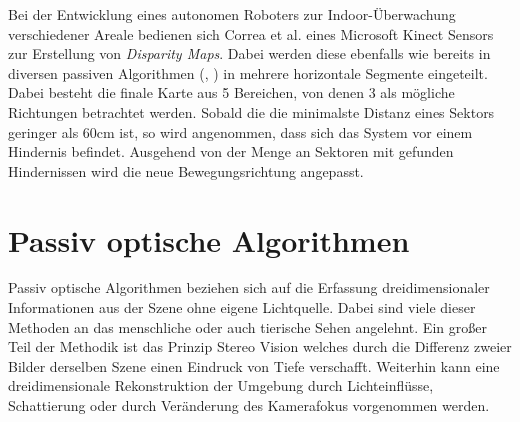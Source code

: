 \noindent
Bei der Entwicklung eines autonomen Roboters zur Indoor-Überwachung verschiedener Areale bedienen sich Correa et al. \cite{correa2012mobile} eines Microsoft Kinect Sensors zur Erstellung von \emph{Disparity Maps}. Dabei werden diese ebenfalls wie bereits in diversen passiven Algorithmen (\cite{pire2012stereo}, \cite{kostavelis2010comparative}) in mehrere horizontale Segmente eingeteilt. Dabei besteht die finale Karte aus 5 Bereichen, von denen 3 als mögliche Richtungen betrachtet werden. Sobald die die minimalste Distanz eines Sektors geringer als 60cm ist, so wird angenommen, dass sich das System vor einem Hindernis befindet. Ausgehend von der Menge an Sektoren mit gefunden Hindernissen wird die neue Bewegungsrichtung angepasst.

\section{Passiv optische Algorithmen}
\label{sec:sensor_basierte_he}
Passiv optische Algorithmen beziehen sich auf die Erfassung dreidimensionaler Informationen aus der Szene ohne eigene Lichtquelle. Dabei sind viele dieser Methoden an das menschliche oder auch tierische Sehen angelehnt. Ein großer Teil der Methodik ist das Prinzip Stereo Vision welches durch die Differenz zweier Bilder derselben Szene einen Eindruck von Tiefe verschafft. Weiterhin kann eine dreidimensionale Rekonstruktion der Umgebung durch Lichteinflüsse, Schattierung oder durch Veränderung des Kamerafokus vorgenommen werden.\\


